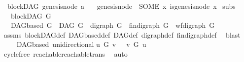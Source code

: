 \begin{isabellebody}
\ {\isacharparenleft}{\kern0pt}\ blockDAG{\isacharparenright}{\kern0pt}\ genesis{\isacharunderscore}{\kern0pt}node{\isacharcolon}{\kern0pt}{\isacharcolon}{\kern0pt}\ {\isachardoublequoteopen}{\isacharprime}{\kern0pt}a{\isachardoublequoteclose}\isanewline
\ \ \ {\isachardoublequoteopen}genesis{\isacharunderscore}{\kern0pt}node\ {\isacharequal}{\kern0pt}\ {\isacharparenleft}{\kern0pt}SOME\ x{\isachardot}{\kern0pt}\ is{\isacharunderscore}{\kern0pt}genesis{\isacharunderscore}{\kern0pt}node\ x{\isacharparenright}{\kern0pt}{\isachardoublequoteclose}%
\isadelimdocument
%
\endisadelimdocument
%
\isatagdocument
%
\isamarkuptrue%
%
\endisatagdocument
{\isafolddocument}%
%
\isadelimdocument
%
\endisadelimdocument
{}\isamarkupfalse%
\ subs{\isacharcolon}{\kern0pt}\isanewline
\ \ \ {\isachardoublequoteopen}blockDAG\ G{\isachardoublequoteclose}\isanewline
\ \ \ {\isachardoublequoteopen}DAGbased\ G\ {\isasymand}\ DAG\ G\ {\isasymand}\ digraph\ G\ {\isasymand}\ fin{\isacharunderscore}{\kern0pt}digraph\ G\ {\isasymand}\ wf{\isacharunderscore}{\kern0pt}digraph\ G{\isachardoublequoteclose}\isanewline
%
\isadelimproof
\ \ %
\endisadelimproof
%
\isatagproof
{}\isamarkupfalse%
\ assms\ blockDAG{\isacharunderscore}{\kern0pt}def\ DAGbased{\isacharunderscore}{\kern0pt}def\ DAG{\isacharunderscore}{\kern0pt}def\ digraph{\isacharunderscore}{\kern0pt}def\ fin{\isacharunderscore}{\kern0pt}digraph{\isacharunderscore}{\kern0pt}def\ \isamarkupfalse%
\ blast%
\endisatagproof
{\isafoldproof}%
%
\isadelimproof
\isanewline
%
\endisadelimproof
\ \ \isanewline
{}\isamarkupfalse%
\ {\isacharparenleft}{\kern0pt}\ DAGbased{\isacharparenright}{\kern0pt}\ unidirectional{\isacharcolon}{\kern0pt}\isanewline
{\isachardoublequoteopen}u\ {\isasymrightarrow}\isactrlsup {\isacharplus}{\kern0pt}\isactrlbsub G\isactrlesub \ v\ {\isasymlongrightarrow}\ {\isasymnot}{\isacharparenleft}{\kern0pt}\ v\ {\isasymrightarrow}\isactrlsup {\isacharasterisk}{\kern0pt}\isactrlbsub G\isactrlesub \ u{\isacharparenright}{\kern0pt}{\isachardoublequoteclose}\isanewline
%
\isadelimproof
\ \ %
\endisadelimproof
%
\isatagproof
{}\isamarkupfalse%
\ cycle{\isacharunderscore}{\kern0pt}free\ reachable{}{\isacharunderscore}{\kern0pt}reachable{\isacharunderscore}{\kern0pt}trans\ \isamarkupfalse%
\ auto%
\endisatagproof
{\isafoldproof}%
%
\isadelimproof
%
\endisadelimproof
%
\isadelimdocument
%
\endisadelimdocument

\end{isabellebody}
